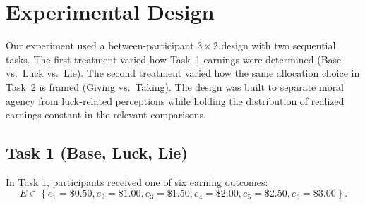 \documentclass{article}
\begin{document}
\section{Experimental Design} \label{design}

Our experiment used a between-participant $3 \times 2$ design with two sequential tasks. The first treatment varied how Task~1 earnings were determined (Base vs.\ Luck vs.\ Lie). The second treatment varied how the same allocation choice in Task~2 is framed (Giving vs.\ Taking). The design was built to separate moral agency from luck-related perceptions while holding the distribution of realized earnings constant in the relevant comparisons.

\subsection{Task 1 (Base, Luck, Lie)}
In Task 1, participants received one of six earning outcomes: $$E \in \left\{ e_{1}=\$0.50, e_{2}=\$1.00, e_{3}=\$1.50, e_{4}=\$2.00, e_{5}=\$2.50, e_{6}=\$3.00 \right\}.$$  
\end{document}
